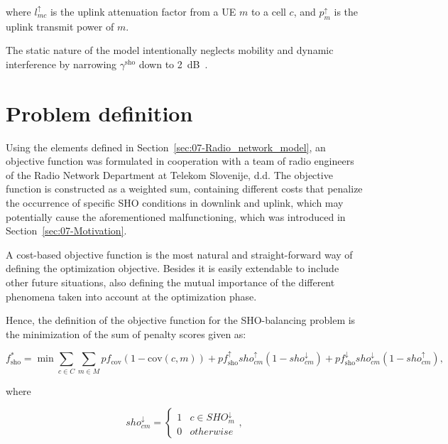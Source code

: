 \noindent where $l_{mc}^{\uparrow}$ is the uplink attenuation factor
from a UE $m$ to a cell $c$, and $p_{m}^{\uparrow}$
is the uplink transmit power of $m$.

The static nature of the model intentionally neglects mobility and
dynamic interference by narrowing $\gamma^{\mathrm{sho}}$ down to
2~dB~\cite{Nawrocki-Understanding_UMTS_radio_network_modelling_and_optimisation:2006}.


\section{Problem definition \label{sec:07-Problem_definition}}

Using the elements defined in Section~\ref{sec:07-Radio_network_model},
an objective function was formulated in cooperation with a team of
radio engineers of the Radio Network Department at Telekom Slovenije,
d.d. The objective function is constructed as a weighted sum, containing
different costs that penalize the occurrence of specific SHO conditions
in downlink and uplink, which may potentially cause the aforementioned
malfunctioning, which was introduced in Section~\ref{sec:07-Motivation}.

A cost-based objective function is the most natural and straight-forward
way of defining the optimization objective. Besides it is easily extendable
to include other future situations, also defining the mutual importance
of the different phenomena taken into account at the optimization
phase.

Hence, the definition of the objective function for the SHO-balancing
problem is the minimization of the sum of penalty scores given as:

\begin{equation}
f_{\mathrm{sho}}^{*}=\min\sum_{c\in C}\sum_{m\in M}pf_{\mathrm{cov}}(1-\mathrm{cov}(c,m))+pf_{\mathrm{sho}}^{\uparrow}sho_{cm}^{\uparrow}(1-sho_{cm}^{\downarrow})+pf_{\mathrm{sho}}^{\downarrow}sho_{cm}^{\downarrow}(1-sho_{cm}^{\uparrow}),\label{eq:07-objective_function}
\end{equation}



\noindent where 

\begin{equation}
sho_{cm}^{\downarrow}=\begin{cases}
1 & c\in SHO_{m}^{\downarrow}\\
0 & otherwise
\end{cases},
\end{equation}


